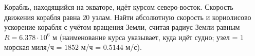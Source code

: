 Корабль, находящийся на экваторе, идёт курсом северо-восток. Скорость
движения корабля равна $20$ узлам. Найти абсолютную скорость и
кориолисово ускорение корабля с учётом вращения Земли, считая радиус
Земли равным $R=6.378\cdot10^6$ м (наименование курса указывает, куда
идёт судно; узел = $1$ морская миля/ч = $1852$ м/ч = $0.5144$ м/с).
